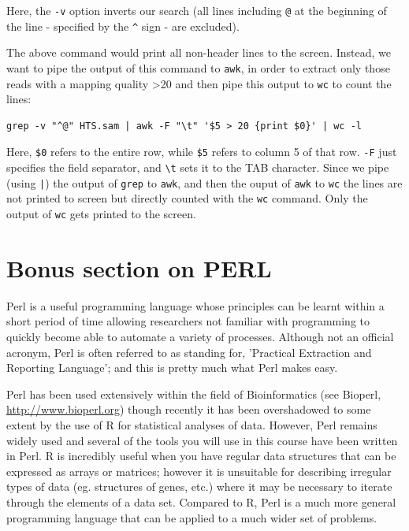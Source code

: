 \documentclass[11pt]{article}
\begin{document}
Here, the \texttt{-v} option inverts our search (all lines including \texttt{@} at
the beginning of the line - specified by the \texttt{\textasciicircum{}} sign - are excluded).

The above command would print all non-header lines to the
screen. Instead, we want to pipe the output of this command to \texttt{awk},
in order to extract only those reads with a mapping quality >20 and
then pipe this output to \texttt{wc} to count the lines:

\begin{verbatim}
grep -v "^@" HTS.sam | awk -F "\t" '$5 > 20 {print $0}' | wc -l
\end{verbatim}

Here, \texttt{\$0} refers to the entire row, while \texttt{\$5} refers to column 5 of
that row. \texttt{-F} just specifies the field separator, and
\texttt{\textbackslash{}t} sets it to the TAB character. Since we pipe (using \texttt{|}) the output of \texttt{grep} to
\texttt{awk}, and then the ouput of \texttt{awk} to \texttt{wc} the lines are not printed to screen but directly
counted with the \texttt{wc} command. Only the output of \texttt{wc} gets printed to the screen.


\section{Bonus section on PERL}
\label{sec-5}

Perl is a useful programming language whose principles can be learnt
within a short period of time allowing researchers not familiar with
programming to quickly become able to automate a variety of processes.
Although not an official acronym, Perl is often referred to as standing
for, 'Practical Extraction and Reporting Language'; and this is pretty much
what Perl makes easy.

Perl has been used extensively within the field of Bioinformatics (see
Bioperl, \url{http://www.bioperl.org}) though recently it has been overshadowed to
some extent by the use of R for statistical analyses of data. However,
Perl remains widely used and several of the tools you will use in this
course have been written in Perl. R is incredibly useful when you have
regular data structures that can be expressed as arrays or matrices;
however it is unsuitable for describing irregular types of data (eg.
structures of genes, etc.) where it may be necessary to iterate through
the elements of a data set. Compared to R, Perl is a much more general
programming language that can be applied to a much wider set of
problems.
\end{document}
